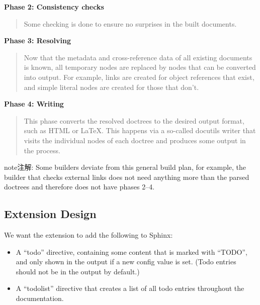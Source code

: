 \documentclass[letterpaper,10pt,english]{sphinxmanual}
\begin{document}
\textbf{Phase 2: Consistency checks}
\begin{quote}

Some checking is done to ensure no surprises in the built documents.
\end{quote}

\textbf{Phase 3: Resolving}
\begin{quote}

Now that the metadata and cross-reference data of all existing documents is
known, all temporary nodes are replaced by nodes that can be converted into
output.  For example, links are created for object references that exist, and
simple literal nodes are created for those that don't.
\end{quote}

\textbf{Phase 4: Writing}
\begin{quote}

This phase converts the resolved doctrees to the desired output format, such
as HTML or LaTeX.  This happens via a so-called docutils writer that visits
the individual nodes of each doctree and produces some output in the process.
\end{quote}

\begin{notice}{note}{注解:}
Some builders deviate from this general build plan, for example, the builder
that checks external links does not need anything more than the parsed
doctrees and therefore does not have phases 2--4.
\end{notice}


\subsection{Extension Design}
\label{ext/tutorial:extension-design}
We want the extension to add the following to Sphinx:
\begin{itemize}
\item {} 
A ``todo'' directive, containing some content that is marked with ``TODO'', and
only shown in the output if a new config value is set.  (Todo entries should
not be in the output by default.)

\item {} 
A ``todolist'' directive that creates a list of all todo entries throughout the
documentation.

\end{itemize}
\end{document}

